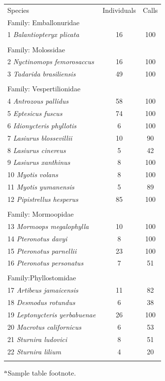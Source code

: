 \documentclass[wsdraft]{ws-rv9x6} %
\begin{document}
\begin{table}[ht]
	{\begin{tabular}{@{}lcc@{}} \toprule
			Species & Individuals & Calls \\ \colrule
			Family: Emballonuridae & & \\
			1 \textit{Balantiopteryx plicata} & 16 & 100 \\
			\\
			Family: Molossidae && \\
			2 \textit{Nyctinomops femorosaccus} & 16 & 100 \\
			3 \textit{Tadarida brasiliensis} & 49 & 100  \\
			\\
			Family: Vespertilionidae && \\
			4 \textit{Antrozous pallidus} & 58 & 100 \\
			5 \textit{Eptesicus fuscus} & 74 & 100 \\
			6 \textit{Idionycteris phyllotis} & 6 & 100 \\
			7 \textit{Lasiurus blossevillii} & 10 & 90 \\
			8 \textit{Lasiurus cinereus} & 5 & 42 \\
			9 \textit{Lasiurus xanthinus} & 8 & 100 \\
			10 \textit{Myotis volans} & 8 & 100 \\
			11 \textit{Myotis yumanensis} & 5 & 89 \\
			12 \textit{Pipistrellus hesperus} & 85 & 100 \\
			\\
			Family: Mormoopidae && \\
			13 \textit{Mormoops megalophylla} & 10 & 100 \\
			14 \textit{Pteronotus davyi} & 8 & 100 \\
			15 \textit{Pteronotus parnellii} & 23 & 100 \\
			16 \textit{Pteronotus personatus} & 7 & 51 \\
			\\
			Family:Phyllostomidae && \\
			17 \textit{Artibeus jamaicensis} & 11 & 82 \\
			18 \textit{Desmodus rotundus} & 6 & 38 \\
			19 \textit{Leptonycteris yerbabuenae} & 26 & 100 \\
			20 \textit{Macrotus californicus} & 6 & 53 \\
			21 \textit{Sturnira ludovici} & 8 & 51 \\
			22 \textit{Sturnira lilium} & 4 & 20 \\
			\botrule
		\end{tabular}
	}
	\begin{tabnote}
		$^{\text a}$Sample table footnote.
	\end{tabnote}
	\label{tab::dataset}
\end{table}
\end{document}
